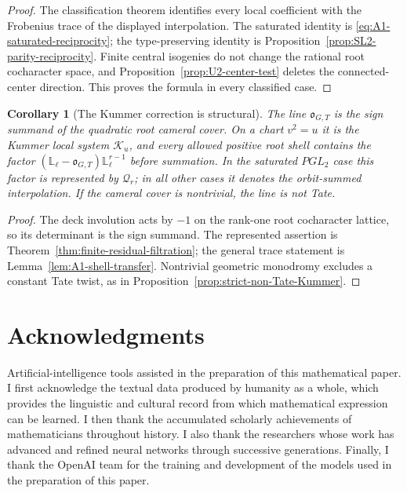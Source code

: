 \documentclass[11pt]{article}
\newtheorem{corollary}[theorem]{Corollary}
\theoremstyle{definition}
\theoremstyle{remark}
\newcommand{\Lell}{\mathbb L_{\ell}}
\newcommand{\cK}{\mathcal K}
\begin{document}
\begin{proof}
The classification theorem identifies every local coefficient with the
Frobenius trace of the displayed interpolation.  The saturated identity is
\eqref{eq:A1-saturated-reciprocity}; the type-preserving identity is
Proposition~\ref{prop:SL2-parity-reciprocity}.  Finite central isogenies do
not change the rational root cocharacter space, and
Proposition~\ref{prop:U2-center-test} deletes the connected-center direction.
This proves the formula in every classified case.
\end{proof}

\begin{corollary}[The Kummer correction is structural]
\label{cor:A1-structural-Kummer}
The line $\mathfrak o_{G,T}$ is the sign summand of the quadratic root
cameral cover.  On a chart $v^2=u$ it is the Kummer local system $\cK_u$,
and every allowed positive root shell contains the factor
$(\Lell-\mathfrak o_{G,T})\Lell^{r-1}$ before summation.  In the saturated
$PGL_2$ case this factor is represented by $\mathscr Q_r$; in all other cases
it denotes the orbit-summed interpolation.  If the cameral cover is
nontrivial, the line is not Tate.
\end{corollary}

\begin{proof}
The deck involution acts by $-1$ on the rank-one root cocharacter lattice, so
its determinant is the sign summand.  The represented assertion is
Theorem~\ref{thm:finite-residual-filtration}; the general trace statement is
Lemma~\ref{lem:A1-shell-transfer}.  Nontrivial geometric monodromy excludes
a constant Tate twist, as in Proposition~\ref{prop:strict-non-Tate-Kummer}.
\end{proof}


\section*{Acknowledgments}

Artificial-intelligence tools assisted in the preparation of this mathematical paper.  I
first acknowledge the textual data produced by humanity as a whole, which
provides the linguistic and cultural record from which mathematical expression
can be learned.  I then thank the accumulated scholarly achievements of
mathematicians throughout history.  I also thank the researchers whose work has
advanced and refined neural networks through successive generations.  Finally,
I thank the OpenAI team for the training and development of the models used in
the preparation of this paper.
\end{document}
